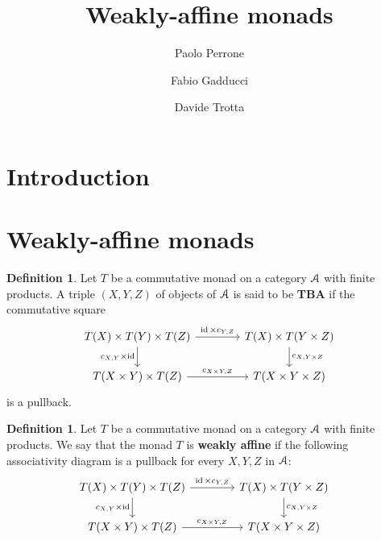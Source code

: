 \documentclass[a4paper,UKenglish,numberwithinsect,cleveref, autoref, thm-restate]{lipics-v2021}
\author{Paolo Perrone}{Department of Computer Science, University of Oxford}{paolo.perrone.math@gmail.com}{ }{}
\author{Fabio Gadducci}{Department of Computer Science, University of Pisa, Pisa, IT}{fabio.gadducci@unipi.it}{ https://orcid.org/
0000-0003-0690-3051}{}
\author{ Davide Trotta }{Department of Computer Science, University of Pisa, Pisa, IT}{trottadavide92@gmail.com}{https://orcid.org/0000-0003-4509-594X}{}
\title{Weakly-affine monads}
\theoremstyle{plain} %
\theoremstyle{definition} %
\newtheorem{mydefinition}[mytheorem]{Definition}
\begin{document}
\maketitle
\begin{abstract}

\end{abstract}

\section{Introduction}

\section{Weakly-affine monads}
\begin{mydefinition}
Let $T$ be a commutative monad on a category $\mathcal{A}$ with finite products. A triple $(X,Y,Z)$ of objects of $\mathcal{A}$ is said to be \textbf{TBA} if the commutative square 
\[\begin{tikzcd}[column sep=3.3pc]
			T(X) \times T(Y) \times T(Z) \ar{r}{\id \times c_{Y,Z}} \ar[swap]{d}{c_{X,Y} \times \id}	& T(X) \times T(Y \times Z) \ar{d}{c_{X,Y \times Z}}	\\
			T(X \times Y) \times T(Z) \ar{r}{c_{X\times Y,Z}}						& T(X \times Y \times Z)
		\end{tikzcd}
		\]
		is a pullback.
\end{mydefinition}

\begin{mydefinition}
	Let $T$ be a commutative monad on a category $\mathcal{A}$ with finite products. 
	We say that the monad $T$ is \textbf{weakly affine} if the
	following associativity diagram is a pullback for every $X,Y,Z$ in $\mathcal{A}$:
	\begin{equation}
		\label{c_assoc_pullback}
		\hspace{-9pt}	%
		\begin{tikzcd}[column sep=3.3pc]
			T(X) \times T(Y) \times T(Z) \ar{r}{\id \times c_{Y,Z}} \ar[swap]{d}{c_{X,Y} \times \id}	& T(X) \times T(Y \times Z) \ar{d}{c_{X,Y \times Z}}	\\
			T(X \times Y) \times T(Z) \ar{r}{c_{X\times Y,Z}}						& T(X \times Y \times Z)
		\end{tikzcd}
	\end{equation}
\end{mydefinition}
\end{document}
